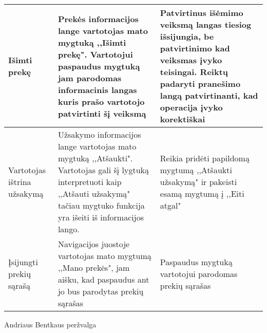 \documentclass[oneside]{VUMIFPSkursinis}
\begin{document}
\begin{center}
    \begin{tabular}{ |p{4cm}| p{6cm} | p{7cm} | }
    \hline

	Išimti prekę & Prekės informacijos lange vartotojas mato mygtuką ,,Išimti prekę". Vartotojui paspaudus mygtuką jam parodomas informacinis langas kuris prašo vartotojo patvirtinti šį veiksmą & Patvirtinus išėmimo veiksmą langas tiesiog išsijungia, be patvirtinimo kad veiksmas įvyko teisingai. Reiktų padaryti pranešimo langą patvirtinanti, kad operacija įvyko korektiškai \\ \hline
	Vartotojas ištrina užsakymą & Užsakymo informacijos lange vartotojas mato mygtuką ,,Atšaukti". Vartotojas gali šį lygtuką interpretuoti kaip ,,Atšauti užsakymą" tačiau mygtuko funkcija yra išeiti iš informacijos lango.&
	Reikia pridėti papildomą mygtumą ,,Atšaukti užsakymą" ir pakeisti esamą mygtumą į ,,Eiti atgal" \\ \hline
	Įsijungti prekių sąrašą & Navigacijos juostoje vartotojas mato mygtumą ,,Mano prekės", jam aišku, kad paspaudus ant jo bus parodytas prekių sąrašas & Paspaudus mygtuką vartotojui parodomas prekių sąrašas \\ \hline
   \hline
    \end{tabular}
\end{center}
\pagebreak
Andriaus Bentkaus peržvalga
\end{document}

